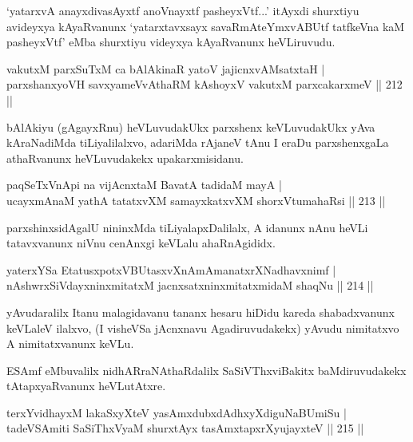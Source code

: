 \begin{artha}
`yatarxvA anayxdivasAyxtf anoV\s nayxtf pasheyxVtf...' itAyxdi shurxtiyu avideyxya kAyaRvanunx `yatarxtavxsayx savaRmAteYmxvABUtf tatfkeVna kaM pasheyxVtf' eMba shurxtiyu videyxya kAyaRvanunx heVLiruvudu.
\end{artha}

\begin{shl}
vakutxM parxSuTxM ca bAlAkinaR yatoV jajicnxvAMsatxtaH |\\
parxshanxyoVH savxyameVvAthaRM kAshoyxV vakutxM parxcakarxmeV \hfill || 212 ||
\end{shl}

\begin{artha}
bAlAkiyu (gAgayxRnu) heVLuvudakUkx parxshenx keVLuvudakUkx yAva kAraNadiMda tiLiyalilalxvo, adariMda rAjaneV tAnu I eraDu parxshenxgaLa athaRvanunx heVLuvudakekx upakarxmisidanu.
\end{artha}

\begin{shl}
paqSeTxVnApi na vijAcnxtaM BavatA tadidaM mayA |\\
ucayxmAnaM yathA tatatxvXM samayxkatxvXM shorxVtumahaRsi \hfill || 213 ||
\end{shl}

\begin{artha}
parxshinxsidAgalU nininxMda tiLiyalapxDalilalx, A idanunx nAnu heVLi tatavxvanunx niVnu cenAnxgi keVLalu ahaRnAgididx.
\end{artha}


\begin{shl}
yaterxYSa EtatusxpotxV\s BUtasxvXnAmAmanatxrXNadhavxnimf |\\
nAshwrxSiVdayxninxmitatxM jacnxsatxninxmitatxmidaM shaqNu \hfill || 214 ||
\end{shl}

\begin{artha}
yAvudaralilx Itanu malagidavanu tananx hesaru hiDidu kareda shabadxvanunx keVLaleV ilalxvo, (I visheVSa jAcnxnavu Agadiruvudakekx) yAvudu nimitatxvo A nimitatxvanunx keVLu.
\end{artha}

\begin{artha}
ESAmf eMbuvalilx nidhARraNAthaRdalilx SaSiVThxviBakitx baMdiruvudakekx tAtapxyaRvanunx heVLutAtxre.
\end{artha}

\begin{shl}
terxYvidhayxM lakaSxyXteV yasAmxdubxdAdhxyXdiguNaBUmiSu |\\
tadeVSAmiti SaSiThxVyaM shurxtAyx tasAmxtapxrXyujayxteV \hfill || 215 ||
\end{shl}

